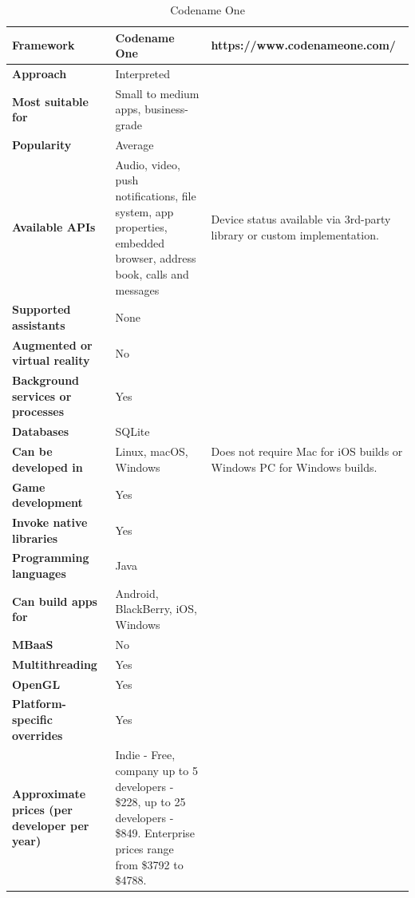 \documentclass[english,master,public,dept460,male,cpdeclaration,oneside]{diploma}
\begin{document}
\begin{table}[!h]
	\centering
	\caption{Codename One}
	\begin{tabular}{p{} | p{} | p{}}
		\toprule		
		\textbf{Framework} & \textbf{Codename One} & https://www.codenameone.com/ \\
		\midrule
		\textbf{Approach} & Interpreted & \\			
		\midrule	
		\textbf{Most suitable for} & Small to medium apps, business-grade & \\
		\midrule
		\textbf{Popularity} & Average & \\			
		\midrule
		\textbf{Available APIs} & Audio, video, push notifications, file system, app properties, embedded browser, address book, calls and messages & Device status available via 3rd-party library or custom implementation. \\			
		\midrule
		\textbf{Supported assistants} & None & \\			
		\midrule
		\textbf{Augmented or virtual reality} & No & \\			
		\midrule
		\textbf{Background services or processes} & Yes & \\			
		\midrule
		\textbf{Databases} & SQLite & \\			
		\midrule
		\textbf{Can be developed in} & Linux, macOS, Windows & Does not require Mac for iOS builds or Windows PC for Windows builds.  \\			
		\midrule
		\textbf{Game development} & Yes & \\			
		\midrule
		\textbf{Invoke native libraries} & Yes & \\			
		\midrule
		\textbf{Programming languages} & Java & \\			
		\midrule
		\textbf{Can build apps for} & Android, BlackBerry, iOS, Windows & \\			
		\midrule
		\textbf{MBaaS} & No & \\			
		\midrule
		\textbf{Multithreading} & Yes & \\			
		\midrule
		\textbf{OpenGL} & Yes & \\			
		\midrule
		\textbf{Platform-specific overrides} & Yes & \\			
		\midrule
		\textbf{Approximate prices (per developer per year)} & Indie - Free, company up to 5 developers - \$228, up to 25 developers - \$849. Enterprise prices range from \$3792 to \$4788. & \\			
		\midrule
	\end{tabular}
\end{table}
\end{document}
